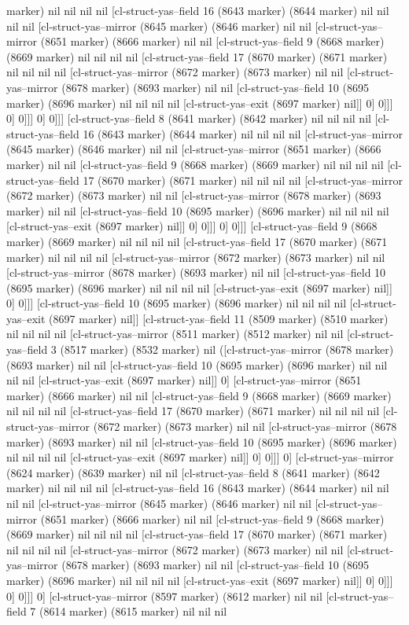 {{marker) nil nil nil nil [cl-struct-yas--field 16 (8643 marker) (8644 marker) nil nil nil nil [cl-struct-yas--mirror (8645 marker) (8646 marker) nil nil [cl-struct-yas--mirror (8651 marker) (8666 marker) nil nil [cl-struct-yas--field 9 (8668 marker) (8669 marker) nil nil nil nil [cl-struct-yas--field 17 (8670 marker) (8671 marker) nil nil nil nil [cl-struct-yas--mirror (8672 marker) (8673 marker) nil nil [cl-struct-yas--mirror (8678 marker) (8693 marker) nil nil [cl-struct-yas--field 10 (8695 marker) (8696 marker) nil nil nil nil [cl-struct-yas--exit (8697 marker) nil]] 0] 0]]] 0] 0]]] 0] 0]]] [cl-struct-yas--field 8 (8641 marker) (8642 marker) nil nil nil nil [cl-struct-yas--field 16 (8643 marker) (8644 marker) nil nil nil nil [cl-struct-yas--mirror (8645 marker) (8646 marker) nil nil [cl-struct-yas--mirror (8651 marker) (8666 marker) nil nil [cl-struct-yas--field 9 (8668 marker) (8669 marker) nil nil nil nil [cl-struct-yas--field 17 (8670 marker) (8671 marker) nil nil nil nil [cl-struct-yas--mirror (8672 marker) (8673 marker) nil nil [cl-struct-yas--mirror (8678 marker) (8693 marker) nil nil [cl-struct-yas--field 10 (8695 marker) (8696 marker) nil nil nil nil [cl-struct-yas--exit (8697 marker) nil]] 0] 0]]] 0] 0]]] [cl-struct-yas--field 9 (8668 marker) (8669 marker) nil nil nil nil [cl-struct-yas--field 17 (8670 marker) (8671 marker) nil nil nil nil [cl-struct-yas--mirror (8672 marker) (8673 marker) nil nil [cl-struct-yas--mirror (8678 marker) (8693 marker) nil nil [cl-struct-yas--field 10 (8695 marker) (8696 marker) nil nil nil nil [cl-struct-yas--exit (8697 marker) nil]] 0] 0]]] [cl-struct-yas--field 10 (8695 marker) (8696 marker) nil nil nil nil [cl-struct-yas--exit (8697 marker) nil]] [cl-struct-yas--field 11 (8509 marker) (8510 marker) nil nil nil nil [cl-struct-yas--mirror (8511 marker) (8512 marker) nil nil [cl-struct-yas--field 3 (8517 marker) (8532 marker) nil ([cl-struct-yas--mirror (8678 marker) (8693 marker) nil nil [cl-struct-yas--field 10 (8695 marker) (8696 marker) nil nil nil nil [cl-struct-yas--exit (8697 marker) nil]] 0] [cl-struct-yas--mirror (8651 marker) (8666 marker) nil nil [cl-struct-yas--field 9 (8668 marker) (8669 marker) nil nil nil nil [cl-struct-yas--field 17 (8670 marker) (8671 marker) nil nil nil nil [cl-struct-yas--mirror (8672 marker) (8673 marker) nil nil [cl-struct-yas--mirror (8678 marker) (8693 marker) nil nil [cl-struct-yas--field 10 (8695 marker) (8696 marker) nil nil nil nil [cl-struct-yas--exit (8697 marker) nil]] 0] 0]]] 0] [cl-struct-yas--mirror (8624 marker) (8639 marker) nil nil [cl-struct-yas--field 8 (8641 marker) (8642 marker) nil nil nil nil [cl-struct-yas--field 16 (8643 marker) (8644 marker) nil nil nil nil [cl-struct-yas--mirror (8645 marker) (8646 marker) nil nil [cl-struct-yas--mirror (8651 marker) (8666 marker) nil nil [cl-struct-yas--field 9 (8668 marker) (8669 marker) nil nil nil nil [cl-struct-yas--field 17 (8670 marker) (8671 marker) nil nil nil nil [cl-struct-yas--mirror (8672 marker) (8673 marker) nil nil [cl-struct-yas--mirror (8678 marker) (8693 marker) nil nil [cl-struct-yas--field 10 (8695 marker) (8696 marker) nil nil nil nil [cl-struct-yas--exit (8697 marker) nil]] 0] 0]]] 0] 0]]] 0] [cl-struct-yas--mirror (8597 marker) (8612 marker) nil nil [cl-struct-yas--field 7 (8614 marker) (8615 marker) nil nil nil }}
